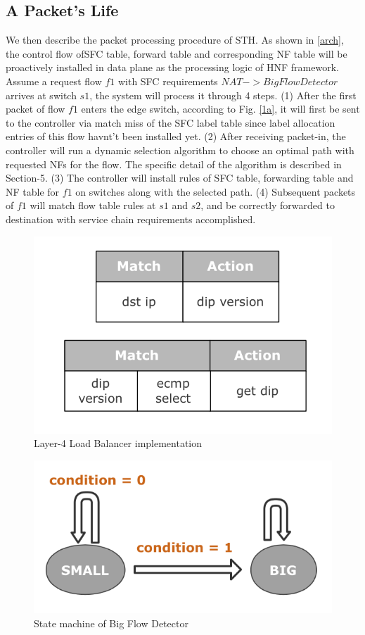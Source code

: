 \documentclass[10pt, conference, letterpaper]{IEEEtran}
\begin{document}
\subsection{A Packet's Life}
We then describe the packet processing procedure of STH.
As shown in \ref{arch}, the control flow ofSFC table, forward table and corresponding NF table will be proactively installed in data plane as the processing logic of HNF framework.
Assume a request flow $f1$ with SFC requirements $NAT->Big Flow Detector$ arrives at switch $s1$, the system will process it through 4 steps.
(1) After the first packet of flow $f1$ enters the edge switch, according to Fig. \ref{1a}, it will first be sent to the controller via match miss of the SFC label table since label allocation entries of this flow havnt't been installed yet.
(2) After receiving packet-in, the controller will run a dynamic selection algorithm to choose an optimal path with requested NFs for the flow. The specific detail of the algorithm is described in Section-5. 
(3) The controller will install rules of SFC table, forwarding table and NF table for $f1$ on switches along with the selected path.
(4) Subsequent packets of $f1$ will match flow table rules at $s1$ and $s2$, and be correctly forwarded to destination  with service chain requirements accomplished.


\begin{figure}[t]
\centerline{\includegraphics[scale=0.4]{src/lb.png}}
\caption{Layer-4 Load Balancer implementation}
\label{stateless}
\end{figure}

\begin{figure}[t]
\centerline{\includegraphics[scale=0.4]{src/fsm.png}}
\caption{State machine of Big Flow Detector}
\label{fsm}
\end{figure}
\end{document}
